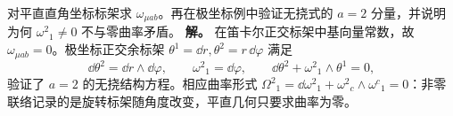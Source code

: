 \par
\begin{workedexample}
对平直直角坐标标架求 \(\omega_{\mu ab}\)。再在极坐标例中验证无挠式的 \(a=2\) 分量，并说明为何 \(\omega^2{}_1\ne0\) 不与零曲率矛盾。
\textbf{解。} 在笛卡尔正交标架中基向量常数，故 \(\omega_{\mu ab}=0\)。极坐标正交余标架 \(\theta^1=\dd r,\theta^2=r\,\dd\varphi\) 满足
\[
\dd\theta^2=\dd r\wedge\dd\varphi,\qquad
\omega^2{}_1=\dd\varphi,\qquad
\dd\theta^2+\omega^2{}_1\wedge\theta^1=0,
\]
验证了 \(a=2\) 的无挠结构方程。相应曲率形式 \(\Omega^2{}_1=\dd\omega^2{}_1+\omega^2{}_c\wedge\omega^c{}_1=0\)：非零联络记录的是旋转标架随角度改变，平直几何只要求曲率为零。
\end{workedexample}
\par
